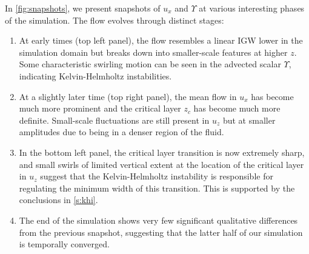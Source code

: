 \documentclass[
        fleqn,
        usenatbib,
        referee,
    ]{mnras}
\begin{document}
In \autoref{fig:snapshots}, we present snapshots of $u_x$ and $\Upsilon$ at
various interesting phases of the simulation. The flow evolves through distinct
stages:
\begin{enumerate}
    \item At early times (top left panel), the flow resembles a linear IGW lower
        in the simulation domain but breaks down into smaller-scale features at
        higher $z$. Some characteristic swirling motion can be seen in the
        advected scalar $\Upsilon$, indicating Kelvin-Helmholtz instabilities.

    \item At a slightly later time (top right panel), the mean flow in
        $u_x$ has become much more prominent and the critical layer $z_c$ has
        become much more definite. Small-scale fluctuations are still present in
        $u_z$ but at smaller amplitudes due to being in a denser region of the
        fluid.

    \item In the bottom left panel, the critical layer transition is now
        extremely sharp, and small swirls of limited vertical extent at the
        location of the critical layer in $u_z$ suggest that the
        Kelvin-Helmholtz instability is responsible for regulating the minimum
        width of this transition. This is supported by the conclusions in
        \autoref{s:khi}.

    \item  The end of the simulation shows very few significant qualitative
        differences from the previous snapshot, suggesting that the latter half
        of our simulation is temporally converged.
\end{enumerate}
\end{document}

